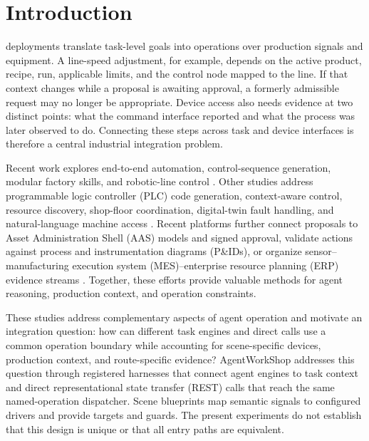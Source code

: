 \section{Introduction}
 deployments translate task-level goals into
operations over production signals and equipment. A line-speed adjustment,
for example, depends on the active product, recipe, run, applicable limits,
and the control node mapped to the line. If that context changes while a
proposal is awaiting approval, a formerly admissible request may no longer be
appropriate. Device access also needs evidence at two distinct points: what
the command interface reported and what the process was later observed to do.
Connecting these steps across task and device interfaces is therefore a
central industrial integration problem.

Recent work explores end-to-end automation, control-sequence generation,
modular factory skills, and robotic-line control
\cite{xia2025control,huang2026made,koehle2026llmdriven,waseem2026pretrained}.
Other studies address programmable logic controller (PLC) code generation,
context-aware control, resource discovery, shop-floor coordination,
digital-twin fault handling, and natural-language machine access
\cite{liu2026agents4plc,wu2025instructmpc,lim2025llmenabled,zhao2026shopfloor,gill2025llmdt,hofmann2025nlc}.
Recent platforms further connect proposals to Asset Administration Shell
(AAS) models and signed approval, validate actions against process and
instrumentation diagrams (P\&IDs), or organize sensor--manufacturing
execution system (MES)--enterprise resource planning (ERP) evidence streams
\cite{graul2026aas,schall2026safe,lin2026agentic}. Together, these efforts
provide valuable methods for agent reasoning, production context, and
operation constraints.

These studies address complementary aspects of agent operation and motivate an
integration question: how can different task engines and direct calls use a
common operation boundary while accounting for scene-specific devices,
production context, and route-specific evidence? AgentWorkShop addresses this
question through registered harnesses that connect agent engines to task
context and direct representational state transfer (REST) calls that reach the
same named-operation dispatcher. Scene blueprints map semantic signals to
configured drivers and provide targets and guards. The present experiments do
not establish that this design is unique or that all entry paths are equivalent.

